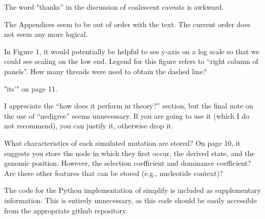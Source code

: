 
\begin{point}{}
The word "thanks” in the discussion of coalescent caveats is awkward.
\end{point}


\begin{point}{}
The Appendices seem to be out of order with the text. The current order does
not seem any more logical.
\end{point}


\begin{point}{}
In Figure 1, it would potentially be helpful to see y-axis on a log scale so
that we could see scaling on the low end. Legend for this figure refers to
``right column of panels''. How many threads were used to obtain the dashed line?
\end{point}


\begin{point}{}
"its'" on page 11.
\end{point}


\begin{point}{}
I appreciate the ``how does it perform in theory?'' section, but the final note
on the use of ``nedigree'' seems unnecessary. If you are going to use it (which I
do not recommend), you can justify it, otherwise drop it.
\end{point}


\begin{point}{}
What characteristics of each simulated mutation are stored? On page 10, it
suggests you store the node in which they first occur, the derived state, and
the genomic position. However, the selection coefficient and dominance
coefficient? Are there other features that can be stored (e.g., nucleotide
context)?
\end{point}


\begin{point}{}
The code for the Python implementation of simplify is included as supplementary
information. This is entirely unnecessary, as this code should be easily
accessible from the appropriate github repository.
\end{point}

